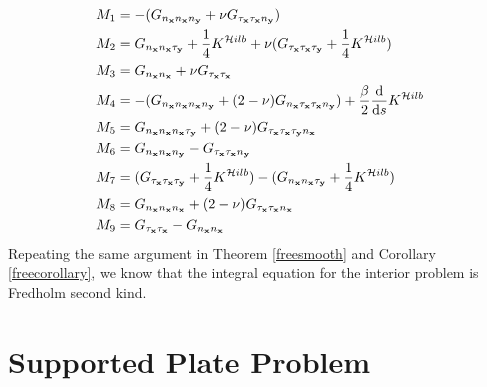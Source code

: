 \documentclass[preprint,12pt,3p]{elsarticle}
\newcommand{\dd}{ {\rm d} }
\begin{document}
\begin{align}
     M_{1} & =  - (G_{n_\mathbf{x} n_\mathbf{x} n_\mathbf{y}} + \nu G_{\tau_\mathbf{x} \tau_\mathbf{x} n_\mathbf{y}})\\
     M_{2} &= G_{n_\mathbf{x} n_\mathbf{x} \tau_\mathbf{y}}  + \frac{1}{4}K^{\mathcal{H}ilb}  +   \nu (G_{\tau_\mathbf{x} \tau_\mathbf{x} \tau_\mathbf{y}} + \frac{1}{4}K^{\mathcal{H}ilb} )\\
     M_{3} &=  G_{n_\mathbf{x} n_\mathbf{x}} + \nu G_{\tau_\mathbf{x} \tau_\mathbf{x}}\\
     M_{4} &= -(G_{n_\mathbf{x} n_\mathbf{x} n_\mathbf{x} n_\mathbf{y}} + (2-\nu)G_{n_\mathbf{x} \tau_\mathbf{x}\tau_\mathbf{x} n_\mathbf{y}}) + \frac{\beta}{2} \frac{\dd}{\dd s} K^{\mathcal{H}ilb}  \\
     M_{5} &=  G_{n_\mathbf{x} n_\mathbf{x} n_\mathbf{x}\tau_\mathbf{y} } + (2-\nu) G_{\tau_\mathbf{x} \tau_\mathbf{x} \tau_\mathbf{y} n_\mathbf{x}} \\
     M_{6} &= G_{n_\mathbf{x} n_\mathbf{x} n_\mathbf{y}}-G_{\tau_\mathbf{x} \tau_\mathbf{x} n_\mathbf{y}}   \\
     M_{7} &= (G_{\tau_\mathbf{x} \tau_\mathbf{x} \tau_\mathbf{y}} + \frac{1}{4}K^{\mathcal{H}ilb} ) - (G_{n_\mathbf{x} n_\mathbf{x} \tau_\mathbf{y} } + \frac{1}{4}K^{\mathcal{H}ilb} ) \\
     M_{8} &= G_{n_\mathbf{x} n_\mathbf{x} n_\mathbf{x}} + (2-\nu) G_{\tau_\mathbf{x} \tau_\mathbf{x} n_\mathbf{x}} \\
     M_{9} &= G_{\tau_\mathbf{x} \tau_\mathbf{x}} -  G_{n_\mathbf{x} n_\mathbf{x}}  
\end{align}
Repeating the same argument in Theorem \ref{freesmooth} and Corollary \ref{freecorollary}, we know that the integral equation for the interior problem is Fredholm second kind.


\section{Supported Plate Problem} \label{supportedsection}
\end{document}
